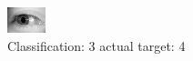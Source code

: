 \begin{figure}[h!]
\begin{center}
\includegraphics[width=0.60\columnwidth]{figures/ID3226_class_3_target_4.png}
\end{center}
\caption{ Classification: 3 actual target: 4}
\label{fig:ID3226_class_3_target_4}
\end{figure}
